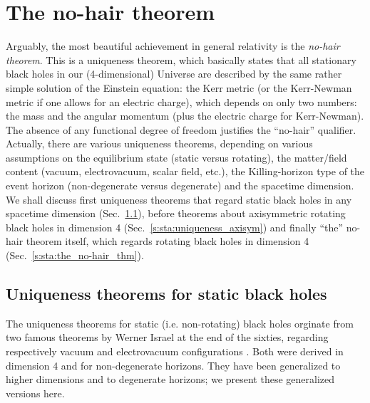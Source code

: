 
\section{The no-hair theorem} \label{s:sta:no-hair}

Arguably, the most beautiful achievement in general relativity is the
\emph{no-hair theorem}.
This is a uniqueness theorem, which basically states that all stationary black holes in our (4-dimensional) Universe are
described by the same rather simple solution of the Einstein equation: the Kerr metric
(or the Kerr-Newman metric if one allows for an electric charge), which depends on only
two numbers: the mass and the angular momentum (plus the electric charge for Kerr-Newman).
The absence of any functional degree of freedom justifies the ``no-hair'' qualifier.
Actually, there are various uniqueness theorems, depending on various assumptions
on the equilibrium state (static versus rotating),
the matter/field content (vacuum, electrovacuum, scalar field, etc.),
the Killing-horizon type of the event horizon (non-degenerate versus degenerate) and the spacetime
dimension. We shall discuss first uniqueness theorems that regard static black holes
in any spacetime dimension (Sec.~\ref{s:sta:uniqueness_static}), before
theorems about axisymmetric rotating black holes in dimension 4 (Sec.~\ref{s:sta:uniqueness_axisym})
and finally ``the'' no-hair theorem itself, which regards rotating black holes in dimension 4
(Sec.~\ref{s:sta:the_no-hair_thm}).

\subsection{Uniqueness theorems for static black holes} \label{s:sta:uniqueness_static}

The uniqueness theorems for static (i.e. non-rotating) black holes orginate from
two famous theorems by Werner Israel at the end of the sixties,
regarding respectively vacuum \cite{Israe67}
and electrovacuum configurations \cite{Israe68}. Both were derived in dimension 4
and for non-degenerate horizons. They have been generalized to higher dimensions
and to degenerate horizons; we present these generalized versions here.

